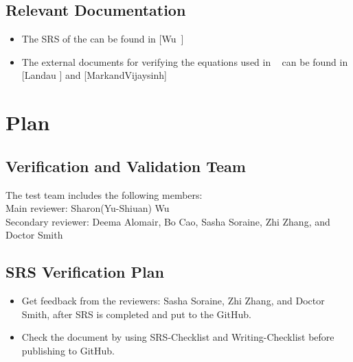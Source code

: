 \documentclass[12pt, titlepage]{article}
\begin{document}

\subsection{Relevant Documentation}\label{RD}

\begin{itemize} 
\item[ ]The SRS of the \progname can be found in [Wu~\cite{YS2019}] 
\item[ ]The external documents for verifying the equations used in \progname~
can be found in [Landau ] \cite{Charles2001} and
[MarkandVijaysinh] \cite{JacobsonandJadhav} 

 \end{itemize} 

 \section{Plan}	
\subsection{Verification and Validation Team} The test team includes the
following members:\\ 
Main reviewer: Sharon(Yu-Shiuan) Wu\\ 
Secondary reviewer: Deema Alomair, Bo Cao, Sasha Soraine, Zhi Zhang, 
and Doctor Smith\\
\subsection{SRS Verification Plan}

\begin{itemize}

\item Get feedback from the reviewers: Sasha Soraine, Zhi Zhang, and Doctor
Smith, after SRS is completed and put to the GitHub.
\item Check the document by using SRS-Checklist and Writing-Checklist before
publishing to GitHub.

\end{itemize}
\end{document}
